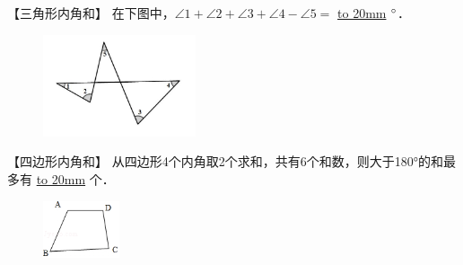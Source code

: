 \item {
    【三角形内角和】
    {在下图中，$\angle 1 + \angle 2 + \angle 3 + \angle 4 - \angle 5=$ \underline{\hbox to 20mm{}} $\degree$．} 
    \begin{figure}[H] 
        \centering
        \includegraphics[width=0.4\textwidth]{./pics/Chapter_3/9.png}
    \end{figure}
    \vspace{1cm}
}

\item {
    【四边形内角和】
    {从四边形4个内角取2个求和，共有6个和数，则大于180°的和最多有 \underline{\hbox to 20mm{}} 个．} 
    \begin{figure}[H] 
        \centering
        \includegraphics[width=0.2\textwidth]{./pics/Chapter_3/11.png}
    \end{figure}
    \vspace{1cm}
}

